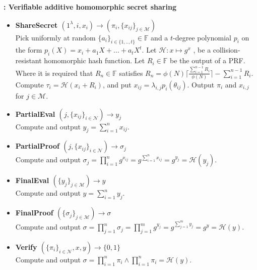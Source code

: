 \begin{algorithm}
\caption{\textbf{: Verifiable additive homomorphic secret sharing}}
\begin{itemize}
  \item\textbf{ShareSecret $(1^\lambda,i,x_i)\xrightarrow[]{}(\pi_i,\{x_{ij}\}_{j\in\mathcal{M}})$}\\
Pick uniformly at random $\{a_i\}_{i\in\{1,..,t\}}\in\mathds{F}$ and a $t$-degree polynomial $p_i$ on the form $p_i(X) = x_i + a_1X+...+a_tX^t$. Let $\mathcal{H}:x\mapsto g^x$
, be a collision-resistant homomorphic hash function. Let $R_i\in\mathds{F}$ be the output of a PRF. Where it is required that  $R_n\in \mathds{F}$  satisfies
$R_n = \phi(N)\lceil \frac{\sum_{i=1}^{n-1}R_i}{\phi(N)}\rceil- \sum_{i=1}^{n-1}R_i $. Compute $\tau_i = \mathcal{H}(x_i+R_i)$, and put $x_{ij}=\lambda_{i,j}p_i(\theta_{ij})$.  Output $\pi_i$ and $x_{i,j}$ for $j\in\mathcal{M}$. 

\item\textbf{PartialEval $(j,\{x_{ij}\}_{i\in\mathcal{N}})\xrightarrow[]{}y_j$}\\
Compute and output $y_j = \sum_{i=1}^n x_{ij}$.

\item\textbf{PartialProof $(j,\{x_{ij}\}_{i\in\mathcal{N}})\xrightarrow[]{}\sigma_j$}\\
Compute and output $\sigma_j = \prod_{i=1}^n g^{x_{ij}} =  g^{\sum_{i=1}^n x_{ij}}= g^{y_j}=\mathcal{H}(y_j)$.

\item\textbf{FinalEval $(\{y_j\}_{j\in\mathcal{M}})\xrightarrow[]{}y$}\\
Compute and output $y = \sum_{i=1}^n y_{j}$.

\item\textbf{FinalProof $(\{\sigma_j\}_{j\in\mathcal{M}})\xrightarrow[]{}\sigma$}\\
Compute and output $\sigma = \prod_{j=1}^n \sigma_j = \prod_{j=1}^m g^{y_{j}} =  g^{\sum_{j=1}^m y_{j}}= g^{y}=\mathcal{H}(y)$.

\item\textbf{Verify $(\{\pi_i\}_{i\in\mathcal{N}},x,y)\xrightarrow[]{}\{0,1\}$}\\
Compute and output $\sigma= \prod_{i=1}^n \pi_i \wedge \prod_{i=1}^n \pi_i = \mathcal{H}(y)$.
\end{itemize}
\label{alg:VAHSS-HSS}
\end{algorithm}


